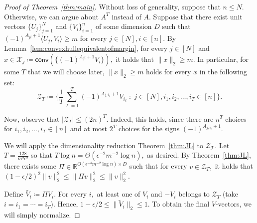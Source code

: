 \documentclass[preprint]{article}
\newcommand{\conv}{\mathsf{conv}}
\begin{document}
\begin{proof}[Proof of Theorem~\ref{thm:main}] Without loss of generality, suppose that $n\le N.$ Otherwise, we can argue about $A^T$ instead of $A.$
Suppose that there exist unit vectors $\{U_j\}_{j = 1}^N $ and $\{V_i\}_{i = 1}^n$ of some dimension $D$ such that $(-1)^{A_{ji}+1}\langle U_j, V_i\rangle \ge m$ for every $j \in [N], i \in [n].$ By Lemma~\ref{lem:convexhullequivalentofmargin}, for every $j \in [N]$ and 
$x\in \mathcal{X}_j\coloneqq \conv(\{(-1)^{A_{ji}+1}V_i\}),$ it holds that $\|x\|_2\ge m.$ In particular, for some $T$ that we will choose later, $\|x\|_2\ge m$ holds for every $x$ in the following set:
$$
\mathcal{Z}_T \coloneqq 
\Big\{
\frac{1}{T}\sum_{\ell = 1}^T(-1)^{A_{j,i_\ell}+1}V_{i_\ell} \; : \; 
j \in [N], i_1, i_2, \ldots, i_T \in [n]
\Big\}.
$$

Now, observe that $|\mathcal{Z}_T|\le (2n)^T.$ Indeed, this holds, since there are $n^T$ choices for $i_1, i_2, \ldots, i_T \in [n]$ and at most $2^T$ choices for the signs $(-1)^{A_{j,i_\ell}+1}.$

We will apply the dimensionality reduction Theorem~\ref{thm:JL} to $\mathcal{Z_T}.$ Let $T = \frac{128}{m^2\epsilon^2}$ so that $T\log n = \Theta(\epsilon^{-2}m^{-2}\log n),$
as desired.
By Theorem~\ref{thm:JL}, there exists some $\Pi \in \mathbb{R}^{O(\epsilon^{-4}m^{-2}\log n)\times D}$ such that for every $v\in \mathcal{Z}_T,$ it holds that 
$(1-\epsilon/2)^2\|v\|_2^2\le \|\Pi v\|^2_2\le \|v\|^2_2.$

Define $\widetilde{V_i}\coloneqq \Pi V_i.$ For every $i,$ at least one of $V_i$ and $-V_i$ belongs to $\mathcal{Z}_T$  (take $i = i_1 = \cdots = i_T$). Hence, $1-\epsilon/2 \le \|\widetilde{V}_i\|_2\le 1.$ To obtain the final $V$-vectors, we will simply normalize.


\end{proof}
\end{document}

